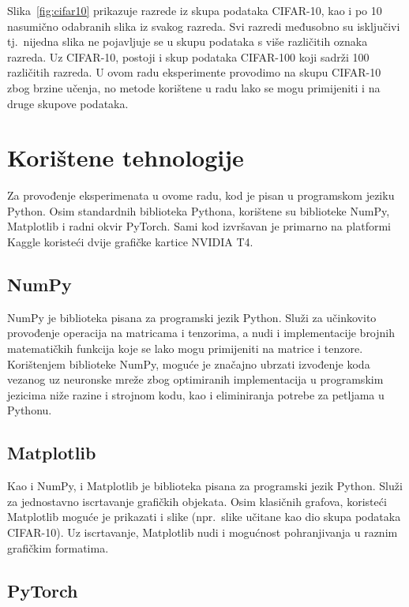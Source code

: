 \documentclass[times, utf8, zavrsni, numeric]{fer}
\begin{document}
Slika~\ref{fig:cifar10} prikazuje razrede iz skupa podataka CIFAR-10, kao i po 10 nasumično odabranih slika iz svakog razreda.
Svi razredi međusobno su isključivi tj.\ nijedna slika ne pojavljuje se u skupu podataka s više različitih oznaka razreda. 
Uz CIFAR-10, postoji i skup podataka CIFAR-100 koji sadrži 100 različitih razreda.
U ovom radu eksperimente provodimo na skupu CIFAR-10 zbog brzine učenja, no metode korištene u radu lako se mogu primijeniti i na druge skupove podataka.

\section{Korištene tehnologije}

Za provođenje eksperimenata u ovome radu, kod je pisan u programskom jeziku Python. Osim standardnih biblioteka Pythona,
korištene su biblioteke NumPy, Matplotlib i radni okvir PyTorch. Sami kod izvršavan je primarno na platformi Kaggle koristeći dvije grafičke kartice NVIDIA T4.

\subsection{NumPy}

NumPy je biblioteka pisana za programski jezik Python. 
Služi za učinkovito provođenje operacija na matricama i tenzorima, a nudi i implementacije brojnih matematičkih funkcija koje se lako mogu primijeniti na matrice i tenzore.
Korištenjem biblioteke NumPy, moguće je značajno ubrzati izvođenje koda vezanog uz neuronske mreže zbog optimiranih implementacija u programskim jezicima niže razine i strojnom kodu,
kao i eliminiranja potrebe za petljama u Pythonu.

\subsection{Matplotlib}

Kao i NumPy, i Matplotlib je biblioteka pisana za programski jezik Python.
Služi za jednostavno iscrtavanje grafičkih objekata. 
Osim klasičnih grafova, koristeći Matplotlib moguće je prikazati i slike (npr.\ slike učitane kao dio skupa podataka CIFAR-10).
Uz iscrtavanje, Matplotlib nudi i mogućnost pohranjivanja u raznim grafičkim formatima.

\subsection{PyTorch}
\end{document}
